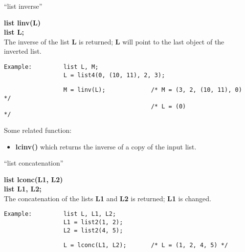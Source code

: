 \newpage

\begin{center} ``list inverse'' \end{center}
{\bf list linv(L)\\
list L;}\\[2ex]
The inverse of the list {\bf L} is returned; {\bf L} will point to the last object of the inverted list.

\begin{verbatim}
Example:         list L, M;
                 L = list4(0, (10, 11), 2, 3);
\end{verbatim}

\vspace*{6cm}


\leer
\begin{verbatim}
                 M = linv(L);             /* M = (3, 2, (10, 11), 0) */
                                          /* L = (0)                 */
\end{verbatim}

\vspace*{6.5cm}


Some related function:

\begin{itemize}
\item[] {\bf lcinv()} which returns the inverse of a copy of the input list.
\end{itemize}

\newpage

\begin{center}  ``list concatenation'' \end{center}
{\bf list lconc(L1, L2)\\
list L1, L2;}\\[2ex]
The concatenation of the lists {\bf L1} and {\bf L2} is returned; {\bf L1} is changed.

\begin{verbatim}
Example:         list L, L1, L2;
                 L1 = list2(1, 2);
                 L2 = list2(4, 5);
\end{verbatim}

\vspace*{8cm}


\newpage

\begin{verbatim}
                 L = lconc(L1, L2);       /* L = (1, 2, 4, 5) */
\end{verbatim}


